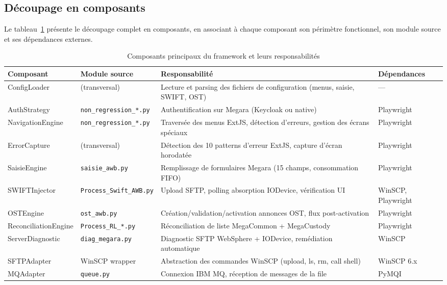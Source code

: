 \documentclass[12pt, a4paper]{report}
\begin{document}
\subsection{Découpage en composants}

Le tableau~\ref{tab:composants} présente le découpage complet en composants, en associant à chaque composant son périmètre fonctionnel, son module source et ses dépendances externes.

\begin{table}[H]
\centering
\caption{Composants principaux du framework et leurs responsabilités}
\label{tab:composants}
\begin{tabularx}{\textwidth}{p{3.0cm}p{3.0cm}Xp{2.0cm}}
\toprule
\textbf{Composant}       & \textbf{Module source}          & \textbf{Responsabilité}                                                  & \textbf{Dépendances} \\
\midrule
ConfigLoader             & (transversal)                   & Lecture et parsing des fichiers de configuration (menus, saisie, SWIFT, OST) & —\\[3pt]
AuthStrategy             & \texttt{non\_regression\_*.py}  & Authentification sur Megara (Keycloak ou native)                         & Playwright \\[3pt]
NavigationEngine         & \texttt{non\_regression\_*.py}  & Traversée des menus ExtJS, détection d'erreurs, gestion des écrans spéciaux & Playwright \\[3pt]
ErrorCapture             & (transversal)                   & Détection des 10 patterns d'erreur ExtJS, capture d'écran horodatée      & Playwright \\[3pt]
SaisieEngine             & \texttt{saisie\_awb.py}         & Remplissage de formulaires Megara (15 champs, consommation FIFO)          & Playwright \\[3pt]
SWIFTInjector            & \texttt{Process\_Swift\_AWB.py} & Upload SFTP, polling absorption IODevice, vérification UI                & WinSCP, Playwright \\[3pt]
OSTEngine                & \texttt{ost\_awb.py}            & Création/validation/activation annonces OST, flux post-activation        & Playwright \\[3pt]
ReconciliationEngine     & \texttt{Process\_RL\_*.py}      & Réconciliation de liste MegaCommon + MegaCustody                         & Playwright \\[3pt]
ServerDiagnostic         & \texttt{diag\_megara.py}        & Diagnostic SFTP WebSphere + IODevice, remédiation automatique             & WinSCP \\[3pt]
SFTPAdapter              & WinSCP wrapper                  & Abstraction des commandes WinSCP (upload, ls, rm, call shell)             & WinSCP 6.x \\[3pt]
MQAdapter                & \texttt{queue.py}               & Connexion IBM MQ, réception de messages de la file                       & PyMQI \\
\bottomrule
\end{tabularx}
\end{table}
\end{document}
